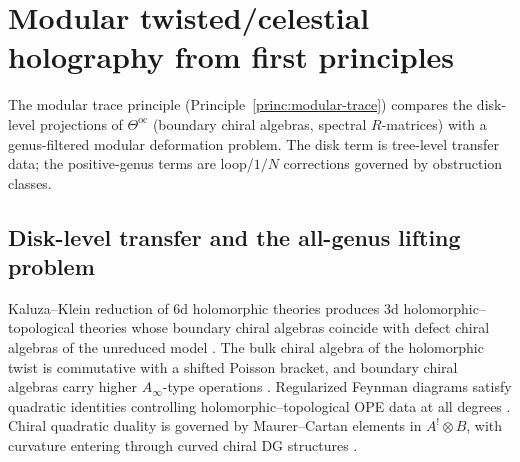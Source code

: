 
\providecommand{\A}{\mathcal A}
\providecommand{\B}{\mathcal B}
\providecommand{\C}{\mathbb C}
\providecommand{\D}{\mathcal D}
\providecommand{\E}{\mathcal E}
\providecommand{\F}{\mathcal F}
\providecommand{\G}{\mathfrak G}
\providecommand{\M}{\mathcal M}
\providecommand{\N}{\mathcal N}
\providecommand{\Q}{\mathbb Q}
\providecommand{\PP}{\mathbb P}
\providecommand{\R}{\mathbb R}
\providecommand{\Z}{\mathbb Z}
\providecommand{\mc}{\mathfrak m}
\providecommand{\h}{\hbar}
\providecommand{\id}{\mathrm{id}}
\providecommand{\Hom}{\operatorname{Hom}}
\providecommand{\MC}{\operatorname{MC}}
\providecommand{\Cone}{\operatorname{Cone}}
\providecommand{\Obs}{\operatorname{Obs}}
\providecommand{\Sym}{\operatorname{Sym}}
\providecommand{\Tr}{\operatorname{Tr}}
\providecommand{\Span}{\operatorname{Span}}
\providecommand{\End}{\operatorname{End}}
\providecommand{\Ext}{\operatorname{Ext}}
\providecommand{\Defcyc}{\operatorname{Def}_{\mathrm{cyc}}}
\providecommand{\Ran}{\operatorname{Ran}}
\providecommand{\gr}{\operatorname{gr}}
\providecommand{\Hb}{H_b^{0,\bullet}(S^3)}
\providecommand{\HCR}{H_{\mathrm{CR}}^{0,\bullet}(S^3)}
\providecommand{\delbar}{\bar\partial}
\providecommand{\delbarb}{\bar\partial_b}
\providecommand{\ot}{\widehat\otimes}
\providecommand{\ov}[1]{\overline{#1}}

\section{Modular twisted/celestial holography from first principles}
\label{sec:modular-twisted-celestial-first-principles}

The modular trace principle (Principle~\ref{princ:modular-trace}) compares the disk-level projections of $\Theta^{\mathrm{oc}}$ (boundary chiral algebras, spectral $R$-matrices) with a genus-filtered modular deformation problem.  The disk term is tree-level transfer data; the positive-genus terms are loop/$1/N$ corrections governed by obstruction classes.

\subsection{Disk-level transfer and the all-genus lifting problem}
\label{subsec:problem-restated-true-level}

Kaluza--Klein reduction of $6$d holomorphic theories produces $3$d holomorphic--topological theories whose boundary chiral algebras coincide with defect chiral algebras of the unreduced model \cite{ZengTwistedHolography}.
The bulk chiral algebra of the holomorphic twist is commutative with a shifted Poisson bracket, and boundary chiral algebras carry higher $A_\infty$-type operations \cite{CostelloDimofteGaiottoBoundary}.
Regularized Feynman diagrams satisfy quadratic identities controlling holomorphic--topological OPE data at all degrees \cite{GaiottoKulpWuHigher}.
Chiral quadratic duality is governed by Maurer--Cartan elements in $A^!\otimes B$, with curvature entering through curved chiral DG structures \cite{GuiLiZengQuadraticDuality}.

